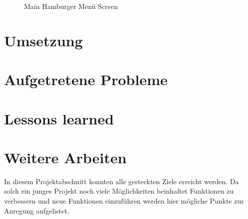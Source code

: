 \documentclass[
    DIV12,
    cleardouble=plain,
    headings=normal,
    pdftex,
    headexclude,footexclude,
    final
]{scrreprt}
\begin{document}
\begin{figure}[ht]
	\centering
	\caption{Main Hamburger Menü Screen}
	\label{fig1}
\end{figure}







\newpage

\chapter{Umsetzung}

\newpage

\chapter{Aufgetretene Probleme}

\newpage

\chapter{Lessons learned}



\newpage

\chapter{Weitere Arbeiten}
In diesem Projektabschnitt konnten alle gesteckten Ziele erreicht werden. Da solch ein junges Projekt noch viele Möglichkeiten beinhaltet Funktionen zu verbessern und neue Funktionen einzuführen werden hier mögliche Punkte zur Anregung aufgelistet.
\newpage


\listoffigures
\end{document}
